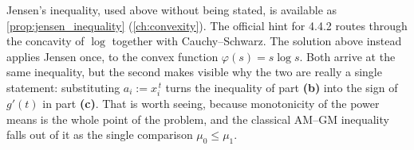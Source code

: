 \begin{remark}
Jensen's inequality, used above without being stated, is available as
\cref{prop:jensen_inequality} (\cref{ch:convexity}). The official hint for 4.4.2 routes through
the concavity of $\log$ together with Cauchy--Schwarz. The solution above instead applies Jensen
once, to the convex function $\varphi(s) = s\log s$. Both arrive at the same inequality, but the
second makes visible why the two are really a single statement: substituting
$a_i := x_i^{\,t}$ turns the inequality of part \textbf{(b)} into the sign of $g'(t)$ in part
\textbf{(c)}. That is
worth seeing, because monotonicity of the power means is the whole point of the problem, and the
classical AM--GM inequality falls out of it as the single comparison $\mu_0 \leq \mu_1$.
\end{remark}
